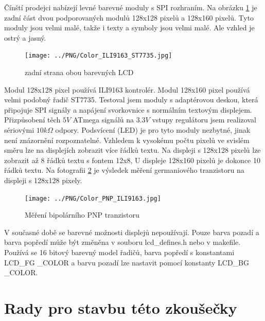 Čínští prodejci nabízejí levné barevné moduly s SPI rozhraním.
Na obrázku \ref{fig:Color_both} je zadní část dvou podporovaných modulů 128x128 pixelů
a 128x160 pixelů.
Tyto moduly jsou velmi malé, takže i texty a symboly jsou velmi malé.
Ale vzhled je ostrý a jasný.

\begin{figure}[H]
\centering
\texttt{[image: ../PNG/Color\_ILI9163\_ST7735.jpg]}
\caption{zadní strana obou barevných LCD}
\label{fig:Color_both}
\end{figure}

Modul 128x128 pixel používá ILI9163 kontrolér.
Modul 128x160 pixel používá velmi podobný řadič ST7735.
Testoval jsem moduly s adaptérovou deskou, která připojuje
SPI signály  a napájení svorkovnice s normálním textovým displejem.
Přizpůsobení těch \(5V\) ATmega signálů na \(3.3V\) vstupy regulátoru
jsem realizoval sériovými \(10k\Omega\) odpory.
Podsvícení (LED) je pro tyto moduly nezbytné, jinak není znázornění rozpoznatelné. 
Vzhledem k vysokému počtu pixelů ve svislém směru lze na displejích zobrazit více řádků textu.
Na displeji s 128x128 pixelů lze zobrazit až 8 řádků textu s fontem 12x8,
U displeje 128x160 pixelů je dokonce 10 řádků textu.
Na fotografii \ref{fig:Color_PNP} je výsledek měření germaniového tranzistoru na
displeji s 128x128 pixely.

\begin{figure}[H]
\centering
\texttt{[image: ../PNG/Color\_PNP\_ILI9163.jpg]}
\caption{Měření bipolárního PNP tranzistoru}
\label{fig:Color_PNP}
\end{figure}

V současné době se barevné možnosti displejů nepoužívají. Pouze barva pozadí
a barva popředí může být změněna v souboru lcd\_defines.h nebo v makefile.
Používá se 16 bitový barevný model řadičů, barva popředí s konstantami
LCD\_FG \_COLOR a barvu pozadí lze nastavit pomocí konstanty LCD\_BG \_COLOR.

\section{Rady pro stavbu této zkoušečky}

